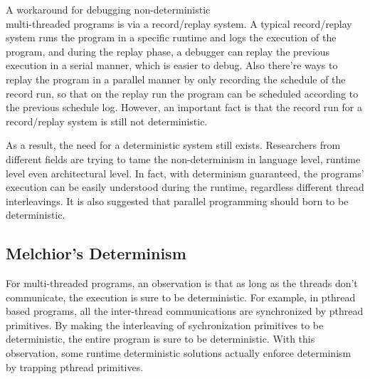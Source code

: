 \documentclass{sig-alternate}
\begin{document}
A workaround for debugging non-deterministic \\multi-threaded programs is via a record/replay system. A typical record/replay system runs the program in a specific runtime and logs the execution of the program, and during the replay phase, a debugger can replay the previous execution in a serial manner, which is easier to debug\cite{veeraraghavan2012doubleplay}. Also there're ways to replay the program in a parallel manner by only recording the schedule of the record run, so that on the replay run the program can be scheduled according to the previous schedule log\cite{cui2010stable}. However, an important fact is that the record run for a record/replay system is still not deterministic.

As a result, the need for a deterministic system still exists. Researchers from different fields are trying to tame the non-determinism in language level\cite{bocchino2009type}\cite{berger2009grace}\cite{leiserson2010cilk++}, runtime level\cite{aviram2012efficient}\cite{cui2013parrot}\cite{liu2011dthreads}\cite{bergan2010coredet}\cite{devietti2009dmp}\cite{olszewski2009kendo} even architectural level\cite{segulja2012architectural}. In fact, with determinism guaranteed, the programs' execution can be easily understood during the runtime, regardless different thread interleavings. It is also suggested that parallel programming should born to be deterministic\cite{bocchino2009parallel}.

\subsection{Melchior's Determinism}
For multi-threaded programs, an observation is that as long as the threads don't communicate, the execution is sure to be deterministic\cite{devietti2009dmp}. For example, in pthread based programs, all the inter-thread communications are synchronized by pthread primitives. By making the interleaving of sychronization primitives to be deterministic, the entire program is sure to be deterministic. With this observation, some runtime deterministic solutions actually enforce determinism by trapping pthread primitives\cite{cui2013parrot}\cite{liu2011dthreads}\cite{olszewski2009kendo}.
\end{document}
